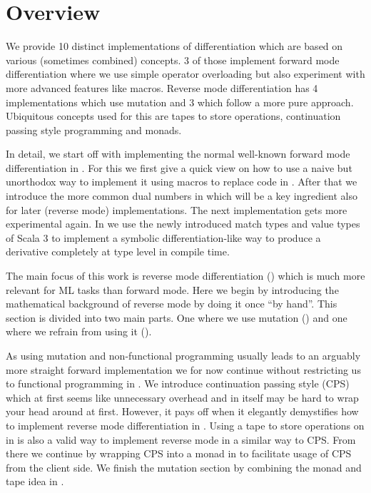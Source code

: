 \section{Overview}
We provide 10 distinct implementations of differentiation which are based on various (sometimes combined) concepts. 3 of those implement forward mode differentiation where we use simple operator overloading but also experiment with more advanced features like macros. Reverse mode differentiation has 4 implementations which use mutation and 3 which follow a more pure approach. Ubiquitous concepts used for this are tapes to store operations, continuation passing style programming and monads.

In detail, we start off with implementing the normal well-known forward mode differentiation in . For this we first give a quick view on how to use a naive but unorthodox way to implement it using macros to replace code in . After that we introduce the more common dual numbers in  which will be a key ingredient also for later (reverse mode) implementations. The next implementation gets more experimental again. In  we use the newly introduced match types and value types of Scala 3 to implement a symbolic differentiation-like way to produce a derivative completely at type level in compile time.

The main focus of this work is reverse mode differentiation () which is much more relevant for ML tasks than forward mode. Here we begin by introducing the mathematical background of reverse mode by doing it once ``by hand''. This section is divided into two main parts. One where we use mutation () and one where we refrain from using it ().

As using mutation and non-functional programming usually leads to an arguably more straight forward implementation we for now continue without restricting us to functional programming in . We introduce continuation passing style (CPS) which at first seems like unnecessary overhead and in itself may be hard to wrap your head around at first. However, it pays off when it elegantly demystifies how to implement reverse mode differentiation in . Using a tape to store operations on in  is also a valid way to implement reverse mode in a similar way to CPS. From there we continue by wrapping CPS into a monad in  to facilitate usage of CPS from the client side. We finish the mutation section by combining the monad and tape idea in .

